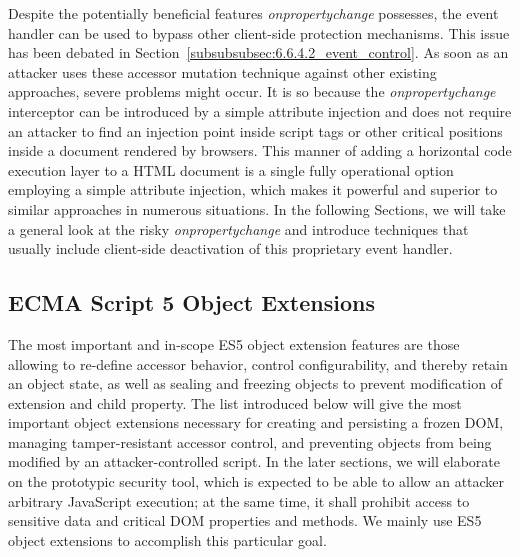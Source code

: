       Despite the potentially beneficial features \textit{onpropertychange} possesses, the event handler can be used to bypass other client-side protection mechanisms. This issue has been debated in Section~\ref{subsubsubsec:6.6.4.2_event_control}. As soon as an attacker uses these accessor mutation technique against other existing approaches, severe problems might occur. It is so because the \textit{onpropertychange} interceptor can be introduced by a simple attribute injection and does not require an attacker to find an injection point inside script tags or other critical positions inside a document rendered by browsers. This manner of adding a horizontal code execution layer to a HTML document is a single fully operational option employing a simple attribute injection, which makes it powerful and superior to similar approaches in numerous situations. In the following Sections, we will take a general look at the risky \textit{onpropertychange} and introduce techniques that usually include client-side deactivation of this proprietary event handler.\\


    \subsection{ECMA Script 5 Object Extensions}
    \label{subsubsec:6.3.2.es5_object_extensions}

      The most important and in-scope ES5 object extension features are those allowing to re-define accessor behavior, control configurability, and thereby retain an object state, as well as sealing and freezing objects to prevent modification of extension and child property. The list introduced below will give the most important object extensions necessary for creating and persisting a frozen DOM, managing tamper-resistant accessor control, and preventing objects from being modified by an attacker-controlled script. In the later sections, we will elaborate on the prototypic security tool, which is expected to be able to allow an attacker arbitrary JavaScript execution; at the same time, it shall prohibit access to sensitive data and critical DOM properties and methods. We mainly use ES5 object extensions to accomplish this particular goal.

